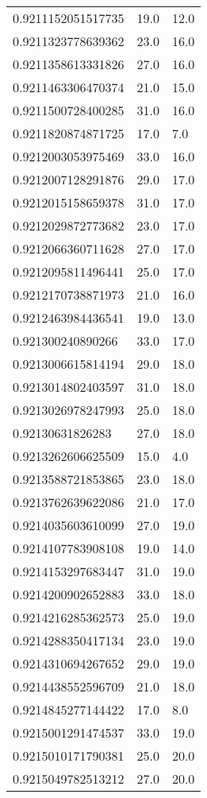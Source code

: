 \begin{center}
\begin{supertabular}[H]{p{0.30\textwidth}p{0.05\textwidth}p{0.05\textwidth}}
0.9211152051517735 & 19.0 & 12.0 \\ 
0.9211323778639362 & 23.0 & 16.0 \\ 
0.9211358613331826 & 27.0 & 16.0 \\ 
0.9211463306470374 & 21.0 & 15.0 \\ 
0.9211500728400285 & 31.0 & 16.0 \\ 
0.9211820874871725 & 17.0 & 7.0 \\ 
0.9212003053975469 & 33.0 & 16.0 \\ 
0.9212007128291876 & 29.0 & 17.0 \\ 
0.9212015158659378 & 31.0 & 17.0 \\ 
0.9212029872773682 & 23.0 & 17.0 \\ 
0.9212066360711628 & 27.0 & 17.0 \\ 
0.9212095811496441 & 25.0 & 17.0 \\ 
0.9212170738871973 & 21.0 & 16.0 \\ 
0.9212463984436541 & 19.0 & 13.0 \\ 
0.921300240890266 & 33.0 & 17.0 \\ 
0.9213006615814194 & 29.0 & 18.0 \\ 
0.9213014802403597 & 31.0 & 18.0 \\ 
0.9213026978247993 & 25.0 & 18.0 \\ 
0.92130631826283 & 27.0 & 18.0 \\ 
0.9213262606625509 & 15.0 & 4.0 \\ 
0.9213588721853865 & 23.0 & 18.0 \\ 
0.9213762639622086 & 21.0 & 17.0 \\ 
0.9214035603610099 & 27.0 & 19.0 \\ 
0.9214107783908108 & 19.0 & 14.0 \\ 
0.9214153297683447 & 31.0 & 19.0 \\ 
0.9214200902652883 & 33.0 & 18.0 \\ 
0.9214216285362573 & 25.0 & 19.0 \\ 
0.9214288350417134 & 23.0 & 19.0 \\ 
0.9214310694267652 & 29.0 & 19.0 \\ 
0.9214438552596709 & 21.0 & 18.0 \\ 
0.9214845277144422 & 17.0 & 8.0 \\ 
0.9215001291474537 & 33.0 & 19.0 \\ 
0.9215010171790381 & 25.0 & 20.0 \\ 
0.9215049782513212 & 27.0 & 20.0 \\ 

\end{supertabular}
\end{center}
